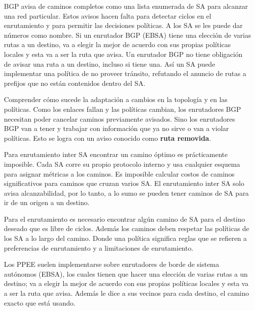 	\par BGP avisa de caminos completos como una lista enumerada de SA para alcanzar una red particular. Estos avisos hacen falta para detectar ciclos en el enrutamiento y para permitir las decisiones políticas. A los SA se les puede dar números como nombre.
Si un enrutador BGP (EBSA) tiene una elección de varias rutas a un destino, va a elegir la mejor de acuerdo con sus propias políticas locales y esta va a ser la ruta que avisa. Un enrutador BGP no tiene obligación de avisar una ruta a un destino, incluso si tiene una.
Así un SA puede implementar una política de no proveer tránsito, refutando el anuncio de rutas a prefijos que no están contenidos dentro del SA.

	\par Comprender cómo sucede la adaptación a cambios en la topología y en las políticas. Como los enlaces fallan y las políticas cambian, los enrutadores BGP necesitan poder cancelar caminos previamente avisados. Sino los enrutadores BGP van a tener y trabajar con información que ya no sirve o van a violar políticas. Esto se logra con un aviso conocido como \textbf{ruta removida}.

	\par Para enrutamiento inter SA encontrar un camino óptimo es prácticamente 	imposible. Cada SA corre su propio protocolo interno y usa cualquier esquema para 	asignar métricas a los caminos. Es imposible calcular costos de caminos significativos para caminos que cruzan varios SA. El enrutamiento inter SA solo avisa alcanzabilidad, por lo tanto, a lo sumo se pueden tener caminos de SA para ir de un origen a un destino.
	
	\par Para el enrutamiento es necesario encontrar algún camino de SA para el destino  deseado que es libre de ciclos. Además los caminos deben respetar las políticas de los SA a lo largo del camino. Donde una política significa reglas que se refieren a preferencias de enrutamiento y a limitaciones de enrutamiento.
   
	\par Los PPEE suelen implementarse sobre enrutadores de borde de sistema 
   autónomos (EBSA), los cuales tienen que hacer una elección de varias rutas a un 
   destino; va a elegir la mejor de acuerdo con sus propias políticas locales y esta va a 
   ser la ruta que avisa. Además le dice a sus vecinos para cada destino, el camino 
   exacto que está usando.
   	
